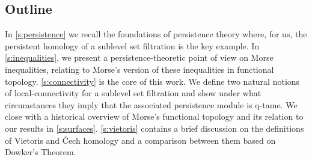 \subsection*{Outline}
In \cref{s:persistence} we recall the foundations of persistence theory where, for us, the persistent homology of a sublevel set filtration is the key example.
In \cref{s:inequalities}, we present a persistence-theoretic point of view on Morse inequalities, relating to Morse's version of these inequalities in functional topology.
\cref{s:connectivity} is the core of this work.
We define two natural notions of local-connectivity for a sublevel set filtration and show under what circumstances they imply that the associated persistence module is q-tame.
We close with a historical overview of Morse's functional topology and its relation to our results in \cref{s:surfaces}.
\cref{s:vietoris} contains a brief discussion on the definitions of Vietoris and \v{C}ech homology and a comparison between them based on Dowker's Theorem.